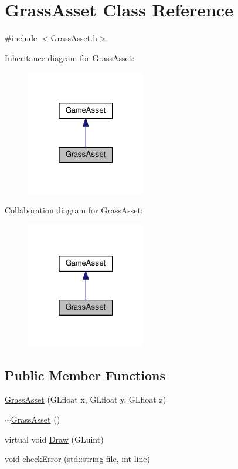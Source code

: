 \hypertarget{classGrassAsset}{}\section{Grass\+Asset Class Reference}
\label{classGrassAsset}


{\ttfamily \#include $<$Grass\+Asset.\+h$>$}



Inheritance diagram for Grass\+Asset\+:\nopagebreak
\begin{figure}[H]
\begin{center}
\leavevmode
\includegraphics[width=148pt]{classGrassAsset__inherit__graph}
\end{center}
\end{figure}


Collaboration diagram for Grass\+Asset\+:\nopagebreak
\begin{figure}[H]
\begin{center}
\leavevmode
\includegraphics[width=148pt]{classGrassAsset__coll__graph}
\end{center}
\end{figure}
\subsection*{Public Member Functions}
\begin{DoxyCompactItemize}
\item 
\hyperlink{classGrassAsset_a961ec7133a9fc6f16a7347a122f95952}{Grass\+Asset} (G\+Lfloat x, G\+Lfloat y, G\+Lfloat z)
\item 
\hyperlink{classGrassAsset_a07e2206bacd2ec120f27f20e5df635b7}{$\sim$\+Grass\+Asset} ()
\item 
virtual void \hyperlink{classGrassAsset_a0178a72c5bf2f00bcc6a240b851f3a25}{Draw} (G\+Luint)
\item 
void \hyperlink{classGrassAsset_a06cf99092ea2217df1855e2d6375396b}{check\+Error} (std\+::string file, int line)
\end{DoxyCompactItemize}


